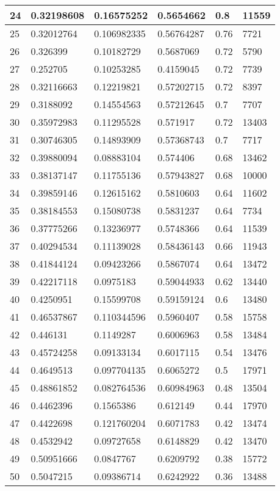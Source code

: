 \begin{longtable}{|l|l|l|l|l|l|}
24 & 0.32198608 & 0.16575252 & 0.5654662 & 0.8 & 11559 \\ \hline 
25 & 0.32012764 & 0.106982335 & 0.56764287 & 0.76 & 7721 \\ \hline 
26 & 0.326399 & 0.10182729 & 0.5687069 & 0.72 & 5790 \\ \hline 
27 & 0.252705 & 0.10253285 & 0.4159045 & 0.72 & 7739 \\ \hline 
28 & 0.32116663 & 0.12219821 & 0.57202715 & 0.72 & 8397 \\ \hline 
29 & 0.3188092 & 0.14554563 & 0.57212645 & 0.7 & 7707 \\ \hline 
30 & 0.35972983 & 0.11295528 & 0.571917 & 0.72 & 13403 \\ \hline 
31 & 0.30746305 & 0.14893909 & 0.57368743 & 0.7 & 7717 \\ \hline 
32 & 0.39880094 & 0.08883104 & 0.574406 & 0.68 & 13462 \\ \hline 
33 & 0.38137147 & 0.11755136 & 0.57943827 & 0.68 & 10000 \\ \hline 
34 & 0.39859146 & 0.12615162 & 0.5810603 & 0.64 & 11602 \\ \hline 
35 & 0.38184553 & 0.15080738 & 0.5831237 & 0.64 & 7734 \\ \hline 
36 & 0.37775266 & 0.13236977 & 0.5748366 & 0.64 & 11539 \\ \hline 
37 & 0.40294534 & 0.11139028 & 0.58436143 & 0.66 & 11943 \\ \hline 
38 & 0.41844124 & 0.09423266 & 0.5867074 & 0.64 & 13472 \\ \hline 
39 & 0.42217118 & 0.0975183 & 0.59044933 & 0.62 & 13440 \\ \hline 
40 & 0.4250951 & 0.15599708 & 0.59159124 & 0.6 & 13480 \\ \hline 
41 & 0.46537867 & 0.110344596 & 0.5960407 & 0.58 & 15758 \\ \hline 
42 & 0.446131 & 0.1149287 & 0.6006963 & 0.58 & 13484 \\ \hline 
43 & 0.45724258 & 0.09133134 & 0.6017115 & 0.54 & 13476 \\ \hline 
44 & 0.4649513 & 0.097704135 & 0.6065272 & 0.5 & 17971 \\ \hline 
45 & 0.48861852 & 0.082764536 & 0.60984963 & 0.48 & 13504 \\ \hline 
46 & 0.4462396 & 0.1565386 & 0.612149 & 0.44 & 17970 \\ \hline 
47 & 0.4422698 & 0.121760204 & 0.6071783 & 0.42 & 13474 \\ \hline 
48 & 0.4532942 & 0.09727658 & 0.6148829 & 0.42 & 13470 \\ \hline 
49 & 0.50951666 & 0.0847767 & 0.6209792 & 0.38 & 15772 \\ \hline 
50 & 0.5047215 & 0.09386714 & 0.6242922 & 0.36 & 13488 \\ \hline 
\end{longtable}
